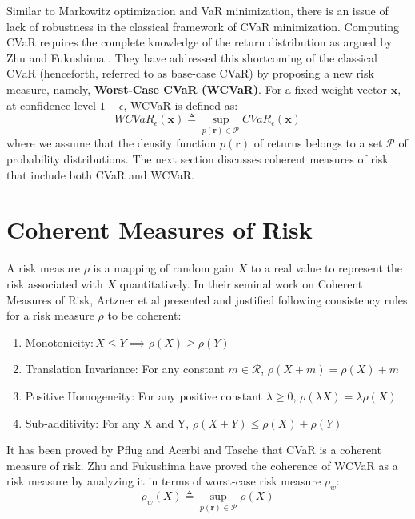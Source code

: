 Similar to Markowitz optimization and VaR minimization, there is an issue of lack of robustness in the classical framework of CVaR minimization. Computing CVaR requires the complete knowledge of the return distribution as argued by Zhu and Fukushima \cite{zhu}. They have addressed this shortcoming of the classical CVaR (henceforth, referred to as base-case CVaR) by proposing a new risk measure, namely, \textbf{Worst-Case CVaR (WCVaR)}. For a fixed weight vector $\mathbf{x}$, at confidence level $1-\epsilon$, WCVaR is defined as:
\begin{equation}
\label{eq:6.2}
WCVaR_{\epsilon}(\mathbf{x}) \triangleq \sup_{p(\mathbf{r}) \in \mathcal{P}}CVaR_{\epsilon}(\mathbf{x})
\end{equation}
where we assume that the density function $p(\mathbf{r})$ of returns belongs to a set $\mathcal{P}$ of probability distributions. The next section discusses coherent measures of risk that include both CVaR and WCVaR.

\section{Coherent Measures of Risk }
A risk measure $\rho$ is a mapping of random gain $X$ to a real value to represent the risk associated with $X$ quantitatively. In their seminal work on Coherent Measures of Risk, Artzner et al \cite{artzner} presented and justified following consistency rules for a risk measure $\rho$ to be coherent:
\begin{enumerate}
    \item{Monotonicity:}{$ \, X \leq Y \implies \rho (X) \geq \rho (Y) $}
    \item{Translation Invariance:}{ For any constant $m \in \mathcal{R}$, $ \rho (X + m) = \rho (X) + m $}
    \item{Positive Homogeneity:}{ For any positive constant $\lambda \geq 0$, $ \rho (\lambda X) = \lambda \rho (X) $}
    \item{Sub-additivity:}{ For any X and Y, $ \rho (X+Y) \leq \rho (X) + \rho(Y) $}
\end{enumerate}

It has been proved by Pflug \cite{pflug} and Acerbi and Tasche \cite{acerbi} that CVaR is a coherent measure of risk. Zhu and Fukushima \cite{zhu} have proved the coherence of WCVaR as a risk measure by analyzing it in terms of worst-case risk measure $\rho_{w}$:
\begin{equation}
\label{eq:6.3}
\rho_{w}(X) \triangleq \sup_{p(\mathbf{r}) \in \mathcal{P}} \rho (X)
\end{equation}



